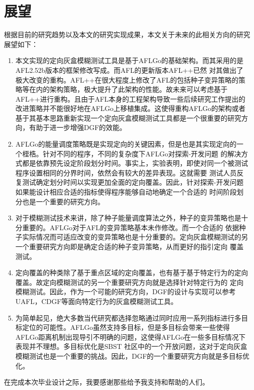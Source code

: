 \documentclass[bachelor]{njupthesis}
\begin{document}
\section{展望}
根据目前的研究趋势以及本文的研究实现成果，本文关于未来的此相关方向的研究展望如下：
\begin{enumerate}[label=(\arabic*)]
	\item 本文实现的定向灰盒模糊测试工具是基于AFLGo的基础架构。而其采用的是AFL2.52b版本的框架修改写成。而AFL的更新版本AFL++已然
	对其做出了极大改变的重构。AFL++在很大程度上修改了AFL的包括种子变异策略的策略等在内的架构策略，极大提升了此架构的性能。故未来可以考虑基于
	AFL++进行重构。且由于AFL本身的工程架构导致一些后续研究工作提出的改进策略并不能很好地在AFLGo上移植集成。这使得重构AFLGo的架构或者
	基于其基本思路重新实现一个定向灰盒模糊测试工具都是一个很重要的研究方向，有助于进一步增强DGF的效能。
	\item AFLGo的能量调度策略既是实现定向的关键因素，但是也是其实现定向的一个桎梏。针对不同的程序，不同的复杂度下AFLGo对探索-开发问题
	的解决方式都是依靠预先设定阶段划分时间。事实上，实验表明，即使对同一个被测试程序设置相同的分界时间，依然会有较大的差异表现。这就需要
	测试人员反复测试确定划分时间以实现更加全面的定向覆盖。因此，针对探索-开发问题如果能设计相应合适的指标使得程序能够自动地确定一个合适的
	时间阶段划分也是一个重要的研究方向。
	\item 对于模糊测试技术来讲，除了种子能量调度算法之外，种子的变异策略也是十分重要的。AFLGo对于AFL的变异策略基本未作修改。而一个合适的
	依据种子实际情况而可适应改变的变异策略也是十分重要的。定向灰盒模糊测试的另一个重要研究方向即是确定合适的种子变异策略，从而更好的指引定向
	覆盖测试。
	\item 定向覆盖的种类除了基于重点区域的定向覆盖，也有基于基于特定行为的定向覆盖。故定向模糊测试的另一个重要研究方向就是选择针对特定行为的
	定向模糊测试。因此，作为一个可能的研究方向，DGF的设计与实现可以参考UAFL，CDGF等面向特定行为的灰盒模糊测试工具。
	\item 为简单起见，绝大多数当代研究都选择忽略通过同时应用一系列指标进行多目标定位的可能性。AFLGo虽然支持多目标，但是多目标会带来一些使得
	AFLGo距离机制出现导引不明确的问题，这使得AFLGo在一些多目标情况下表现并不理想。多目标优化是SBST 社区中的一个开放问题，这对于定向灰盒
	模糊测试也是一个重要的挑战。因此，DGF的一个重要研究方向就是多目标优化。
\end{enumerate}


\thesisacknowledgement
在完成本次毕业设计之际，我要感谢那些给予我支持和帮助的人们。
\end{document}
